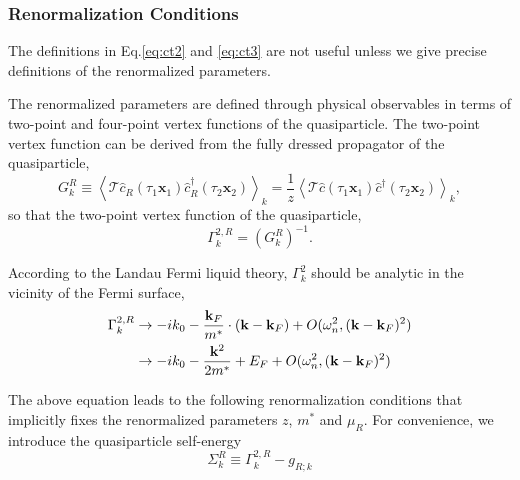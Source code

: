 \documentclass[reprint,amsmath,amssymb,aps,prb]{revtex4-1}
\begin{document}
\subsubsection{Renormalization Conditions}

The definitions in Eq.\eqref{eq:ct2} and \eqref{eq:ct3} are not useful unless we give precise definitions of the renormalized parameters.

The renormalized parameters are defined through physical observables in terms of two-point and four-point vertex functions of the quasiparticle.
The two-point vertex function can be derived from the fully dressed propagator of the quasiparticle,
\begin{equation}
    G^R_k \equiv \left< \mathcal{T} \hat{c}_R(\tau_1 \mathbf{x}_1) \hat{c}_R^{\dag}(\tau_2 \mathbf{x}_2) \right>_k=\frac{1}{z}\left< \mathcal{T} \hat{c}(\tau_1 \mathbf{x}_1) \hat{c}^{\dag}(\tau_2 \mathbf{x}_2) \right>_k,
\end{equation}
so that the two-point vertex function of the quasiparticle,
\begin{equation}
    \Gamma^{2,R}_k = (G^R_k)^{-1}.
\end{equation}

According to the Landau Fermi liquid theory, $\Gamma^2_k$ should be analytic in the vicinity of the Fermi surface,
\begin{align*}
    \Gamma^{2,R}_k & \rightarrow -i k_0-\frac{\bold{k}_F}{m^*}\cdot(\bold{k}-\bold{k}_F)+O(\omega_n^2, (\bold{k}-\bold{k}_F)^2) \\
                   & \rightarrow -i k_0-\frac{\bold{k}^2}{2m^*}+E_F+O(\omega_n^2, (\bold{k}-\bold{k}_F)^2)
\end{align*}

The above equation leads to the following renormalization conditions that implicitly fixes the renormalized parameters $z$, $m^*$ and $\mu_R$.
For convenience, we introduce the quasiparticle self-energy
\begin{equation}
    \Sigma^{R}_k \equiv \Gamma^{2,R}_k-g_{R; k}
\end{equation}
\end{document}

